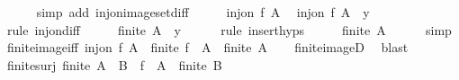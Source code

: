 \begin{isabellebody}
\ \ \ \ \isamarkupfalse%
\ {\isacharparenleft}{\kern0pt}simp\ add{\isacharcolon}{\kern0pt}\ inj{\isacharunderscore}{\kern0pt}on{\isacharunderscore}{\kern0pt}image{\isacharunderscore}{\kern0pt}set{\isacharunderscore}{\kern0pt}diff{\isacharparenright}{\kern0pt}\isanewline
\ \ \isamarkupfalse%
\ \isamarkupfalse%
\ {\isacartoucheopen}inj{\isacharunderscore}{\kern0pt}on\ f\ A{\isacartoucheclose}\ \isamarkupfalse%
\ {\isachardoublequoteopen}inj{\isacharunderscore}{\kern0pt}on\ f\ {\isacharparenleft}{\kern0pt}A\ {\isacharminus}{\kern0pt}\ {\isacharbraceleft}{\kern0pt}y{\isacharbraceright}{\kern0pt}{\isacharparenright}{\kern0pt}{\isachardoublequoteclose}\isanewline
\ \ \ \ \isamarkupfalse%
\ {\isacharparenleft}{\kern0pt}rule\ inj{\isacharunderscore}{\kern0pt}on{\isacharunderscore}{\kern0pt}diff{\isacharparenright}{\kern0pt}\isanewline
\ \ \isamarkupfalse%
\ \isamarkupfalse%
\ {\isachardoublequoteopen}finite\ {\isacharparenleft}{\kern0pt}A\ {\isacharminus}{\kern0pt}\ {\isacharbraceleft}{\kern0pt}y{\isacharbraceright}{\kern0pt}{\isacharparenright}{\kern0pt}{\isachardoublequoteclose}\isanewline
\ \ \ \ \isamarkupfalse%
\ {\isacharparenleft}{\kern0pt}rule\ insert{\isachardot}{\kern0pt}hyps{\isacharparenright}{\kern0pt}\isanewline
\ \ \isamarkupfalse%
\ \isamarkupfalse%
\ {\isachardoublequoteopen}finite\ A{\isachardoublequoteclose}\isanewline
\ \ \ \ \isamarkupfalse%
\ simp\isanewline
{}\isamarkupfalse%
%
\endisatagproof
{\isafoldproof}%
%
\isadelimproof
\isanewline
%
\endisadelimproof
\isanewline
{}\isamarkupfalse%
\ finite{\isacharunderscore}{\kern0pt}image{\isacharunderscore}{\kern0pt}iff{\isacharcolon}{\kern0pt}\ {\isachardoublequoteopen}inj{\isacharunderscore}{\kern0pt}on\ f\ A\ {\isasymLongrightarrow}\ finite\ {\isacharparenleft}{\kern0pt}f\ {\isacharbackquote}{\kern0pt}\ A{\isacharparenright}{\kern0pt}\ {\isasymlongleftrightarrow}\ finite\ A{\isachardoublequoteclose}\isanewline
%
\isadelimproof
\ \ %
\endisadelimproof
%
\isatagproof
{}\isamarkupfalse%
\ finite{\isacharunderscore}{\kern0pt}imageD\ \isamarkupfalse%
\ blast%
\endisatagproof
{\isafoldproof}%
%
\isadelimproof
\isanewline
%
\endisadelimproof
\isanewline
{}\isamarkupfalse%
\ finite{\isacharunderscore}{\kern0pt}surj{\isacharcolon}{\kern0pt}\ {\isachardoublequoteopen}finite\ A\ {\isasymLongrightarrow}\ B\ {\isasymsubseteq}\ f\ {\isacharbackquote}{\kern0pt}\ A\ {\isasymLongrightarrow}\ finite\ B{\isachardoublequoteclose}\isanewline

\end{isabellebody}
